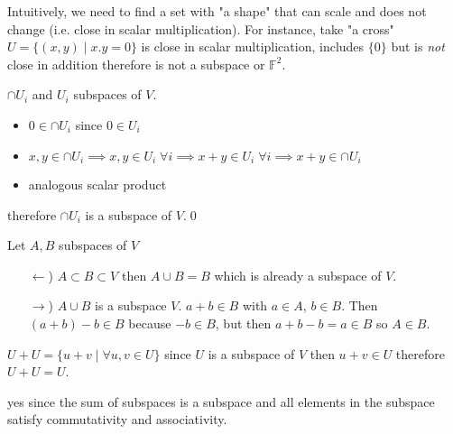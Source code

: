 \exo{} Intuitively, we need to find a set with "a shape" that can scale and does not change (i.e. close in scalar multiplication). 
For instance, take "a cross" $ U = \{ (x,y) \mid x.y = 0 \}$ is close in scalar multiplication, includes $\{0\}$ but is \emph{not} close in addition
therefore is not a subspace or $\mathbb{F}^2$.


\exo{}$\cap U_i$ and $U_i$ subspaces of $V$. 
\begin{itemize}
\item $0 \in \cap U_i$ since $0\in U_i$
\item $x,y \in \cap U_i \implies x,y \in U_i\; \forall i \implies x+y \in U_i\; \forall i \implies x+y\in \cap U_i$
\item analogous scalar product
\end{itemize}
therefore $\cap U_i$ is a subspace of $V$.\qed

\exo{} Let $A,B$ subspaces of $V$
\begin{itemize}
\item[$\leftarrow$)]$A\subset B \subset V$ then $A\cup B = B$ which is already a subspace of $V$.
\item[$\rightarrow$)] $A\cup B$ is a subspace $V$.  $a+b \in B$ with $a\in A$, $b\in B$. Then $ (a + b) - b \in B$ because $-b\in B$, but then $a + b - b = a \in B$ so $A\in B$.
\end{itemize}

\exo{}$U+U =\{ u+v \mid \forall u,v \in U\}$ since $U$ is a subspace of $V$ then $u+v\in U$ therefore $U+U=U$.

\exo{} yes since the sum of subspaces is a subspace and all elements in the subspace satisfy commutativity and associativity. 

